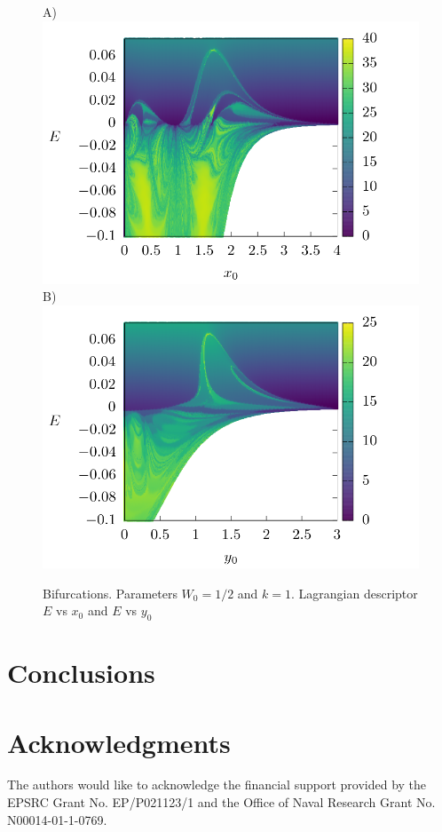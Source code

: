 \documentclass[10pt,aps,onecolumn,superscriptaddress]{revtex4-2}
\begin{document}
\begin{figure}[htbp]
	A)\includegraphics[scale=0.35]{ld_t60_line_x_E.png}
	B)\includegraphics[scale=0.35]{ld_t60_line_y_E.png}
	\caption{ Bifurcations.  Parameters $W_0 = 1/2$ and $k = 1$. Lagrangian descriptor $E$ vs $x_0$ and $E$ vs $y_0$ }
	\label{fig:ld_E_xy}
\end{figure}





\section{Conclusions}
\label{sec:conclusion}

\section*{Acknowledgments}
The authors would like to acknowledge the financial support provided by the EPSRC Grant No. EP/P021123/1 and the Office of Naval Research Grant No. N00014-01-1-0769.


\end{document}
